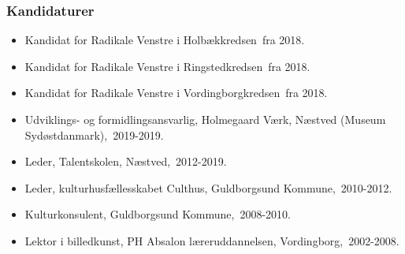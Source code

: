 \documentclass[11pt, a4paper]{awesome-cv}
\begin{document}
\begin{cvletter}
\subsubsection*{Kandidaturer}
\begin{itemize}
\item Kandidat for Radikale Venstre i Holbækkredsen fra 2018.
\item Kandidat for Radikale Venstre i Ringstedkredsen fra 2018.
\item Kandidat for Radikale Venstre i Vordingborgkredsen fra 2018.
\end{itemize}
\begin{itemize}
\item Udviklings- og formidlingsansvarlig, Holmegaard Værk, Næstved (Museum Sydøstdanmark), 2019-2019.
\item Leder, Talentskolen, Næstved, 2012-2019.
\item Leder, kulturhusfællesskabet Culthus, Guldborgsund Kommune, 2010-2012.
\item Kulturkonsulent, Guldborgsund Kommune, 2008-2010.
\item Lektor i billedkunst, PH Absalon læreruddannelsen, Vordingborg, 2002-2008.
\end{itemize}
\end{cvletter}
\end{document}
